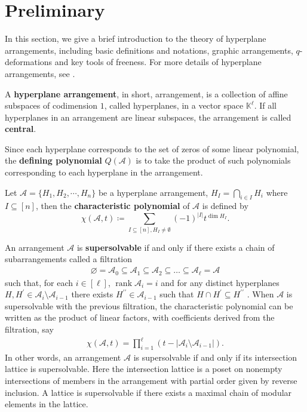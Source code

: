 \documentclass[12pt]{article}
\theoremstyle{plain}%
\theoremstyle{definition}
\DeclareMathOperator{\rank}{rank}
\begin{document}
\section{Preliminary}\label{prelim}
In this section, we give a brief introduction to the theory of hyperplane arrangements, including basic definitions and notations, graphic arrangements, $q$-deformations and key tools of freeness. For more details of hyperplane arrangements, see \cite{orlik1992arrangements}.

A \textbf{hyperplane arrangement}, in short, arrangement, is a collection of affine subspaces of codimension $1$, called hyperplanes, in a vector space $\mathbb{K}^\ell$. If all hyperplanes in an arrangement are linear subspaces, the arrangement is called \textbf{central}.

Since each hyperplane corresponds to the set of zeros of some linear polynomial, the \textbf{defining polynomial} $Q(\mathcal{A})$ is to take the product of such polynomials corresponding to each hyperplane in the arrangement.

Let $\mathcal{A}=\{H_1,H_2,\cdots, H_n\}$ be a hyperplane arrangement, $H_I=\bigcap_{i\in I}H_i$ where $I\subseteq [n]$, then the \textbf{characteristic polynomial} of $\mathcal{A}$ is defined by
    $$\chi(\mathcal{A}, t)\coloneqq\sum_{I\subseteq [n],H_I\neq \emptyset}(-1)^{\left|I\right|}t^{\dim{H_I}}.$$


An arrangement $\mathcal{A}$ is \textbf{supersolvable} if and only if there exists a chain of subarrangements called a filtration
\begin{align*}
\varnothing=\mathcal{A}_{0} \subseteq \mathcal{A}_{1} \subseteq \mathcal{A}_{2} \subseteq \dots \subseteq \mathcal{A}_{\ell} = \mathcal{A}
\end{align*}
such that, for each $i \in [\ell]$, $\rank \mathcal{A}_{i} = i$  and for any distinct hyperplanes $H,H^{\prime} \in \mathcal{A}_{i}\setminus\mathcal{A}_{i-1}$ there exists $H^{\prime\prime}\in\mathcal{A}_{i-1}$ such that $H \cap H^{\prime} \subseteq H^{\prime\prime}$ \cite{bjorner1990hyperplane-dcg}. 
When $\mathcal{A}$ is supersolvable with the previous filtration, the characteristic polynomial can be written as the product of linear factors, with coefficients derived from the filtration, say 
\begin{align*}
\chi(\mathcal{A},t) = \prod_{i=1}^{\ell}(t-|\mathcal{A}_{i}\setminus\mathcal{A}_{i-1}|). 
\end{align*}
In other words, an arrangement $\mathcal{A}$ is supersolvable if and only if its intersection lattice is supersolvable. Here the intersection lattice is a poset on nonempty intersections of members in the arrangement with partial order given by reverse inclusion. A lattice is supersolvable if there exists a maximal chain of modular elements in the lattice\cite{stanley1972supersolvable}.
\end{document}

